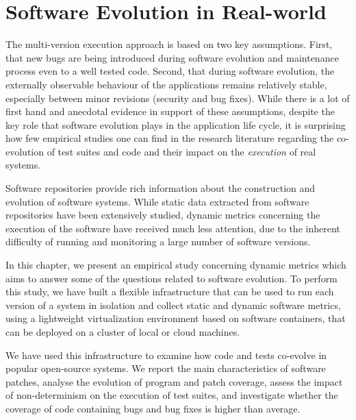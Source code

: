 \chapter{Software Evolution in Real-world}
\label{chap:evolution}

The multi-version execution approach is based on two key assumptions.  First,
that new bugs are being introduced during software evolution and maintenance
process even to a well tested code. Second, that during software evolution,
the externally observable behaviour of the applications remains relatively
stable, especially between minor revisions (\ie security and bug fixes).  While
there is a lot of first hand and anecdotal evidence in support of these
assumptions, despite the key role that software evolution plays in the
application life cycle, it is surprising how few empirical studies one can find
in the research literature regarding the co-evolution of test suites and code
and their impact on the \emph{execution} of real systems.

Software repositories provide rich information about the construction and
evolution of software systems. While static data extracted from software
repositories have been extensively studied, dynamic metrics concerning the
execution of the software have received much less attention, due to the
inherent difficulty of running and monitoring a large number of software
versions.

In this chapter, we present an empirical study concerning dynamic metrics which
aims to answer some of the questions related to software evolution. To perform
this study, we have built a flexible infrastructure that can be used to run
each version of a system in isolation and collect static and dynamic software
metrics, using a lightweight virtualization environment based on software
containers, that can be deployed on a cluster of local or cloud machines.

We have used this infrastructure to examine how code and tests co-evolve in
\numSystems popular open-source systems. We report the main characteristics of
software patches, analyse the evolution of program and patch coverage, assess
the impact of non-determinism on the execution of test suites, and investigate
whether the coverage of code containing bugs and bug fixes is higher than
average.



